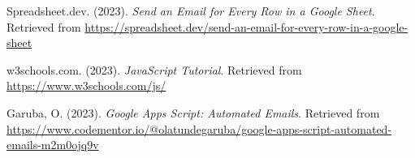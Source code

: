 \documentclass[a4paper, 12pt]{article}
\begin{document}
\begin{thebibliography}{9}
  
    Spreadsheet.dev. (2023). \textit{Send an Email for Every Row in a Google Sheet}. Retrieved from \url{https://spreadsheet.dev/send-an-email-for-every-row-in-a-google-sheet}
    
    w3schools.com. (2023). \textit{JavaScript Tutorial}. Retrieved from \url{https://www.w3schools.com/js/}
    
    Garuba, O. (2023). \textit{Google Apps Script: Automated Emails}. Retrieved from \url{https://www.codementor.io/@olatundegaruba/google-apps-script-automated-emails-m2m0ojq9v}
    
    \end{thebibliography}
    
\end{document}
